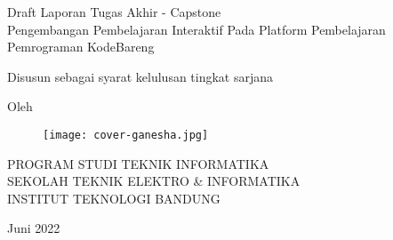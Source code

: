 \clearpage
\pagestyle{empty}

\begin{center}
    \smallskip

    \Large \bfseries \MakeUppercase{\thetitle}
    \vfill

    \Large Draft Laporan Tugas Akhir - Capstone \\
    Pengembangan Pembelajaran Interaktif Pada Platform Pembelajaran Pemrograman KodeBareng
    \vfill

    \large Disusun sebagai syarat kelulusan tingkat sarjana
    \vfill

    \large Oleh

    \Large \theauthor

    \vfill
    \begin{figure}[h]
        \centering
        \texttt{[image: cover-ganesha.jpg]}
    \end{figure}
    \vfill

    \large
    \uppercase{
        Program Studi Teknik Informatika \\
        Sekolah Teknik Elektro \& Informatika \\
        Institut Teknologi Bandung
    }

    Juni 2022

\end{center}

\clearpage

